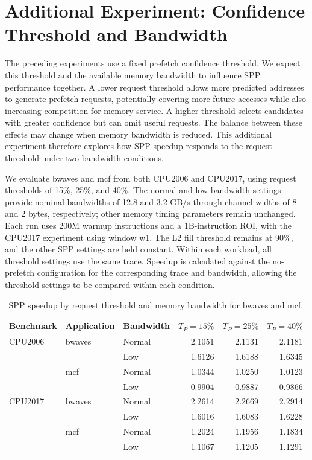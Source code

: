\documentclass[a4paper,11pt]{article}
\begin{document}
\section{Additional Experiment: Confidence Threshold and Bandwidth}
The preceding experiments use a fixed prefetch confidence threshold. We expect this threshold and the available memory bandwidth to influence SPP performance together. A lower request threshold allows more predicted addresses to generate prefetch requests, potentially covering more future accesses while also increasing competition for memory service. A higher threshold selects candidates with greater confidence but can omit useful requests. The balance between these effects may change when memory bandwidth is reduced. This additional experiment therefore explores how SPP speedup responds to the request threshold under two bandwidth conditions.

We evaluate bwaves and mcf from both CPU2006 and CPU2017, using request thresholds of 15\%, 25\%, and 40\%. The normal and low bandwidth settings provide nominal bandwidths of 12.8 and 3.2 GB/s through channel widths of 8 and 2 bytes, respectively; other memory timing parameters remain unchanged. Each run uses 200M warmup instructions and a 1B-instruction ROI, with the CPU2017 experiment using window w1. The L2 fill threshold remains at 90\%, and the other SPP settings are held constant. Within each workload, all threshold settings use the same trace. Speedup is calculated against the no-prefetch configuration for the corresponding trace and bandwidth, allowing the threshold settings to be compared within each condition.

\begin{table}[htbp]
\centering\small
\caption{SPP speedup by request threshold and memory bandwidth for bwaves and mcf.}\label{tab:threshold}
\begin{tabular}{@{}lllrrr@{}}
\toprule
Benchmark & Application & Bandwidth & $T_P=15\%$ & $T_P=25\%$ & $T_P=40\%$\\
\midrule
CPU2006 & bwaves & Normal & 2.1051 & 2.1131 & 2.1181\\
 & & Low & 1.6126 & 1.6188 & 1.6345\\
 & mcf & Normal & 1.0344 & 1.0250 & 1.0123\\
 & & Low & 0.9904 & 0.9887 & 0.9866\\
\midrule
CPU2017 & bwaves & Normal & 2.2614 & 2.2669 & 2.2914\\
 & & Low & 1.6016 & 1.6083 & 1.6228\\
 & mcf & Normal & 1.2024 & 1.1956 & 1.1834\\
 & & Low & 1.1067 & 1.1205 & 1.1291\\
\bottomrule
\end{tabular}
\end{table}
\end{document}
